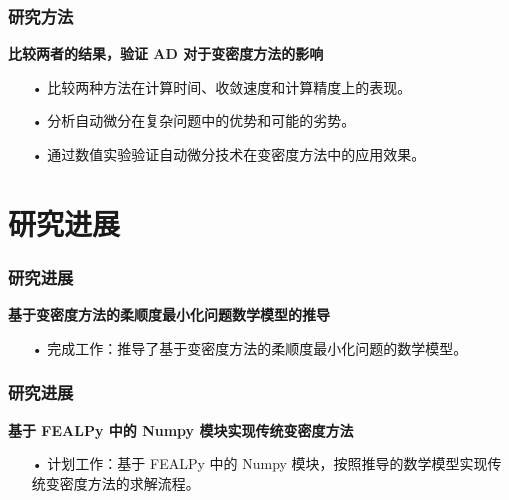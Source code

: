 \documentclass{beamer}
\numberwithin{subsection}{section}
\begin{document}
\begin{frame}
	\frametitle{研究方法}
	 \textbf{比较两者的结果，验证 AD 对于变密度方法的影响}
    \begin{itemize}
        \item[•]比较两种方法在计算时间、收敛速度和计算精度上的表现。
        \vspace{0.3cm}
        \item[•]分析自动微分在复杂问题中的优势和可能的劣势。
        \vspace{0.3cm}
        \item[•]通过数值实验验证自动微分技术在变密度方法中的应用效果。
    \end{itemize}
\end{frame}

\section{研究进展}

\begin{frame}
    \frametitle{研究进展}
    \textbf{基于变密度方法的柔顺度最小化问题数学模型的推导}
    \vspace{0.3cm}
    \begin{itemize}
        \item[•]完成工作：推导了基于变密度方法的柔顺度最小化问题的数学模型。
    \end{itemize}
\end{frame}

\begin{frame}
    \frametitle{研究进展}
    \textbf{基于 FEALPy 中的 Numpy 模块实现传统变密度方法}
    \vspace{0.3cm}
    \begin{itemize}
        \item[•]计划工作：基于 FEALPy 中的 Numpy 模块，按照推导的数学模型实现传统变密度方法的求解流程。
    \end{itemize}
\end{frame}
\end{document}
